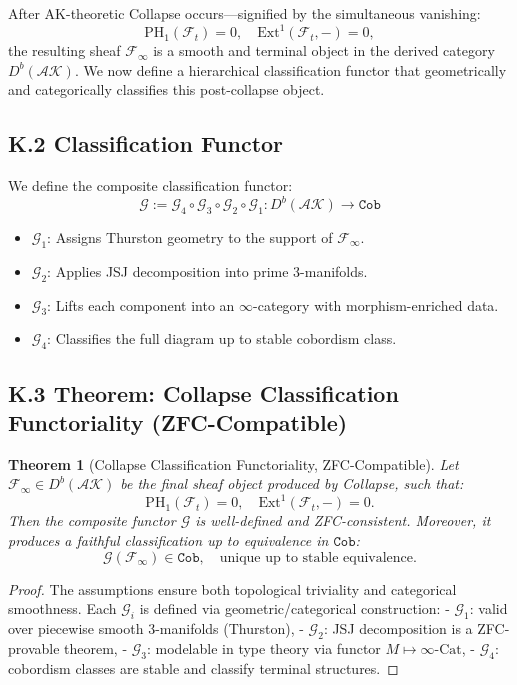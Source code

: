 \documentclass[11pt]{article}
\newtheorem{theorem}{Theorem}[section]
\begin{document}
\begin{axiom}
\begin{axiom}
After AK-theoretic Collapse occurs—signified by the simultaneous vanishing:
\[
\mathrm{PH}_1(\mathcal{F}_t) = 0, \quad \mathrm{Ext}^1(\mathcal{F}_t, -) = 0,
\]
the resulting sheaf \( \mathcal{F}_\infty \) is a smooth and terminal object in the derived category \( D^b(\mathcal{AK}) \).  
We now define a hierarchical classification functor that geometrically and categorically classifies this post-collapse object.

\subsection*{K.2 Classification Functor}

We define the composite classification functor:
\[
\mathcal{G} := \mathcal{G}_4 \circ \mathcal{G}_3 \circ \mathcal{G}_2 \circ \mathcal{G}_1 : D^b(\mathcal{AK}) \longrightarrow \texttt{Cob}
\]
\begin{itemize}
  \item \( \mathcal{G}_1 \): Assigns Thurston geometry to the support of \( \mathcal{F}_\infty \).
  \item \( \mathcal{G}_2 \): Applies JSJ decomposition into prime 3-manifolds.
  \item \( \mathcal{G}_3 \): Lifts each component into an \( \infty \)-category with morphism-enriched data.
  \item \( \mathcal{G}_4 \): Classifies the full diagram up to stable cobordism class.
\end{itemize}

\subsection*{K.3 Theorem: Collapse Classification Functoriality (ZFC-Compatible)}

\begin{theorem}[Collapse Classification Functoriality, ZFC-Compatible]
Let \( \mathcal{F}_\infty \in D^b(\mathcal{AK}) \) be the final sheaf object produced by Collapse, such that:
\[
\mathrm{PH}_1(\mathcal{F}_t) = 0, \quad \mathrm{Ext}^1(\mathcal{F}_t, -) = 0.
\]
Then the composite functor \( \mathcal{G} \) is well-defined and ZFC-consistent.  
Moreover, it produces a faithful classification up to equivalence in \( \texttt{Cob} \):
\[
\mathcal{G}(\mathcal{F}_\infty) \in \texttt{Cob}, \quad \text{unique up to stable equivalence}.
\]
\end{theorem}

\begin{proof}
The assumptions ensure both topological triviality and categorical smoothness.  
Each \( \mathcal{G}_i \) is defined via geometric/categorical construction:
- \( \mathcal{G}_1 \): valid over piecewise smooth 3-manifolds (Thurston),
- \( \mathcal{G}_2 \): JSJ decomposition is a ZFC-provable theorem,
- \( \mathcal{G}_3 \): modelable in type theory via functor \( M \mapsto \infty\text{-Cat} \),
- \( \mathcal{G}_4 \): cobordism classes are stable and classify terminal structures.


\end{proof}
\end{axiom}
\end{axiom}
\end{document}
